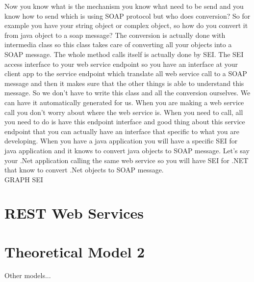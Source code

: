 Now you know what is the mechanism you know what need to be send and you know how to send which is using SOAP protocol
but who does conversion? So for example you have your string object or complex object, so how do you convert it from java
object to a soap message? The conversion is actually done with intermedia class so this class takes care of converting all
your objects into a SOAP message. The whole method calls itself is actually done by SEI. The SEI access interface to your
web service endpoint so you have an interface at your client app to the service endpoint which translate all web service
call to a SOAP message and then it makes sure that the other things is able to understand this message. So we don’t have to
write this class and all the conversion ourselves. We can have it automatically generated for us. When you are making a web
service call you don’t worry about where the web service is. When you need to call, all you need to do is have this endpoint
interface and good thing about this service endpoint that you can actually have an interface that specific to what you are
developing. When you have a java application you will have a specific SEI for java application and it knows to convert java
objects to SOAP message. Let’s say your .Net application calling the same web service so you will have SEI for .NET that know
to convert .Net objects to SOAP message.\\

GRAPH SEI\\
\section{REST Web Services}
\label{section:rest}

\section{Theoretical Model 2}
\label{section:theory2}

Other models...
